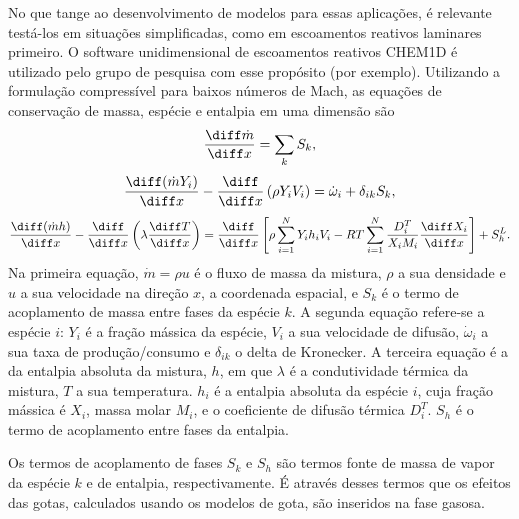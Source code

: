 No que tange ao desenvolvimento de modelos para essas aplicações, é relevante testá-los em situações simplificadas, como em escoamentos reativos laminares primeiro.
O software unidimensional de escoamentos reativos CHEM1D \cite{Sommers1994PhD} é utilizado pelo grupo de pesquisa com esse propósito (por exemplo\cite{SacomanoF2018CTM,SacomanoF2019IJHMT,SacomanoF2021Fluids,SacomanoF2024CF,SacomanoF2025CF}).
Utilizando a formulação compressível para baixos números de Mach, as equações de conservação de massa, espécie e entalpia em uma dimensão 
\cite{SacomanoF2018CTM,SacomanoF2021Fluids,vanOijen2002CTM,vanOijen2016PECS}
são
\begin{equation}
    \frac{\diff \dot m}{\diff x} = \sum_k S_k,
\end{equation}
\begin{equation}
    \frac{\diff(\dot m Y_i)}{\diff x} -
    \frac{\diff}{\diff x} \left(
        \rho Y_i V_i
    \right) =
    \dot \omega_i + \delta_{ik} S_k,
\end{equation}
\begin{equation}
    \frac{\diff(\dot m h)}{\diff x}
    -
    \frac{\diff}{\diff x} 
        \left(
        \lambda %
        \frac{\diff T}{\diff x} 
        \right)
    =
    \frac{\diff}{\diff x}
    \left[
        \rho \sum_{i=1}^N Y_i h_i V_i
        - R T \sum_{i=1}^N \frac{D_i^T}{X_i M_i}
        \frac{\diff X_i}{\diff x}
    \right]
    +
    S_h^L.
\end{equation}
Na primeira equação, $\dot m = \rho u$ é o fluxo de massa da mistura, $\rho$ a sua densidade e $u$ a sua velocidade na direção $x$, a coordenada espacial, e $S_k$ é o termo de acoplamento de massa entre fases da espécie $k$.
A segunda equação refere-se a espécie $i$: $Y_i$ é a fração mássica da espécie, $V_i$ a sua velocidade de difusão, $\dot \omega_i$ a sua taxa de produção/consumo e $\delta_{ik}$ o delta de Kronecker. 
A terceira equação é a da entalpia absoluta da mistura, $h$, em que $\lambda$ é a condutividade térmica da mistura, $T$ a sua temperatura. 
$h_i$ é a entalpia absoluta da espécie $i$, cuja fração mássica é $X_i$, massa molar $M_i$, e o coeficiente de difusão térmica $D_i^T$.
$S_h$ é o termo de acoplamento entre fases da entalpia.

Os termos de acoplamento de fases $S_k$ e $S_h$ são termos fonte de massa de vapor da espécie $k$ e de entalpia, respectivamente.
É através desses termos que os efeitos das gotas, calculados usando os modelos de gota, são inseridos na fase gasosa.

